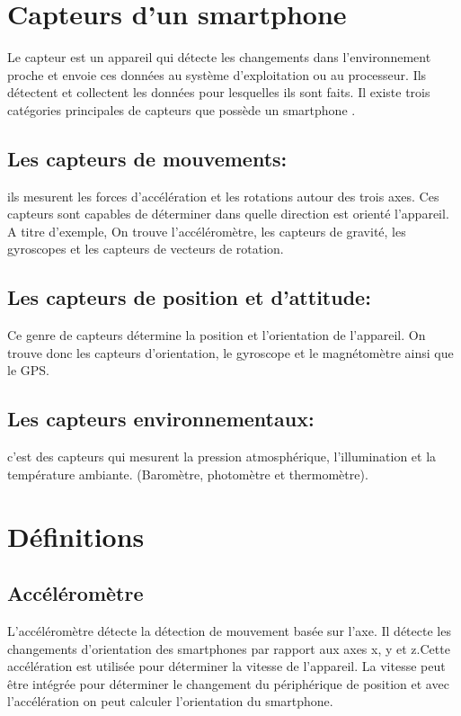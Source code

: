 

\section{Capteurs d'un smartphone} 

Le capteur est un appareil qui détecte les changements dans l'environnement proche et envoie ces données au système d'exploitation ou au processeur. Ils détectent et collectent les données pour lesquelles ils sont faits.\newline
Il existe trois catégories principales de capteurs que possède un smartphone \cite{tilluMobileSensorsComponents2019}.

\subsection{Les capteurs de mouvements:}
 ils mesurent les forces d'accélération et les rotations autour des trois axes.  Ces capteurs sont capables de déterminer dans quelle direction est orienté l’appareil. A titre d’exemple, On trouve l'accéléromètre, les capteurs de gravité, les gyroscopes et les capteurs de vecteurs de rotation.

 \subsection{Les capteurs de position et d’attitude:}
  Ce genre de capteurs détermine la position et l’orientation de l'appareil. On trouve donc les capteurs d’orientation, le gyroscope et le magnétomètre ainsi que le GPS. 
 
 \subsection{Les capteurs environnementaux:}
 c’est des capteurs qui mesurent la pression atmosphérique, l'illumination et la température ambiante. (Baromètre, photomètre et thermomètre).

 \section{Définitions} 

 \subsection{Accéléromètre}
 L'accéléromètre détecte la détection de mouvement basée sur l'axe. Il détecte les changements d'orientation des smartphones par rapport aux axes x, y et z.Cette accélération est utilisée pour déterminer la vitesse de l’appareil. La vitesse peut être intégrée pour déterminer le changement du périphérique de position et avec l’accélération on peut calculer l’orientation du smartphone.

